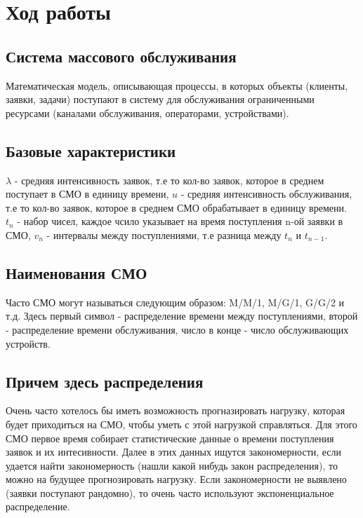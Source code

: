 \chapter{Ход работы}
\label{ch:chap2}

\section*{\textbf{Система массового обслуживания}}

Математическая модель, описывающая процессы, в которых объекты (клиенты, заявки, задачи) поступают в систему для обслуживания 
ограниченными ресурсами (каналами обслуживания, операторами, устройствами).

\section*{\textbf{Базовые характеристики}}

$\lambda$ - средняя интенсивность заявок, т.е то кол-во заявок, которое в среднем поступает в СМО в единицу времени, 
$u$ - средняя интенсивность обслуживания, т.е то кол-во заявок, которое в среднем СМО обрабатывает в единицу времени. \\

$t_n$ - набор чисел, каждое чсило указывает на время поступления n-ой заявки в СМО, $v_n$ - интервалы между поступлениями, т.е
разница между $t_{n}$ и $t_{n-1}$. 

\section*{\textbf{Наименования СМО}}

Часто СМО могут называться следующим образом: M/M/1, M/G/1, G/G/2 и т.д. Здесь первый символ - распределение времени между 
поступлениями, второй - распределение времени обслуживания, число в конце - число обслуживающих устройств.

\section*{\textbf{Причем здесь распределения}}

Очень часто хотелось бы иметь возможность прогназировать нагрузку, которая будет приходиться на СМО, чтобы уметь с этой нагрузкой
справляться. Для этого СМО первое время собирает статистические данные о времени поступления заявок и их интесивности. Далее
в этих данных ищутся закономерности, если удается найти закономерность (нашли какой нибудь закон распределения), то можно на будущее
прогнозировать нагрузку. Если закономерности не выявлено (заявки поступают рандомно), то очень часто используют экспоненциальное
распределение.

